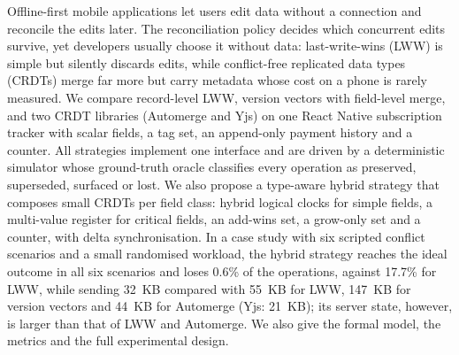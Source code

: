 Offline-first mobile applications let users edit data without a connection and reconcile the edits later. The reconciliation policy decides which concurrent edits survive, yet developers usually choose
it without data: last-write-wins (LWW) is simple but silently discards edits, while conflict-free replicated data
types (CRDTs) merge far more but carry metadata whose cost on a phone is rarely measured. We compare
record-level LWW, version vectors with field-level merge, and two CRDT libraries (Automerge and Yjs) on one
React Native subscription tracker with scalar fields, a tag set, an append-only payment history and a
counter. All strategies implement one interface and are driven by a deterministic simulator whose ground-truth
oracle classifies every operation as preserved, superseded, surfaced or lost. We also propose a type-aware hybrid
strategy that composes small CRDTs per field class: hybrid logical clocks for simple fields, a multi-value register
for critical fields, an add-wins set, a grow-only set and a counter, with delta synchronisation. In a case study
with six scripted conflict scenarios and a small randomised workload, the hybrid strategy reaches the ideal outcome in
all six scenarios and loses 0.6\% of the operations, against 17.7\% for LWW, while sending 32~KB compared with 55~KB
for LWW, 147~KB for version vectors and 44~KB for Automerge (Yjs: 21~KB); its server
state, however, is larger than that of LWW and Automerge. We also give the formal model, the metrics and the full experimental design.
